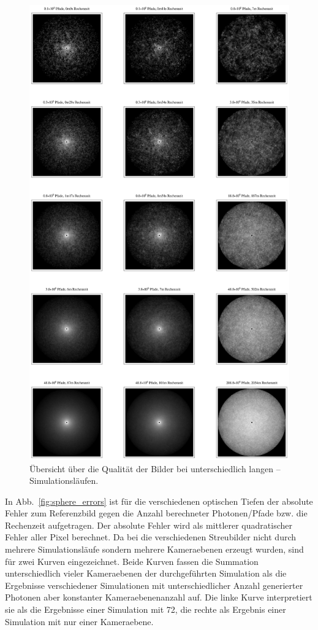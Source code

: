 		\begin{figure}
			\centering
			\includegraphics[height=1.0\textheight]{piratesphereimageoverview.eps}
			\caption{Übersicht über die Qualität der Bilder bei unterschiedlich langen \pirate--Simulationsläufen.}
			\label{fig:pirate_sphere_imageoverview}
		\end{figure}
	
	
	In Abb.~\ref{fig:sphere_errors} ist für die verschiedenen optischen Tiefen der absolute Fehler zum Referenzbild gegen die Anzahl berechneter Photonen/Pfade bzw. die Rechenzeit aufgetragen. Der absolute Fehler wird als mittlerer quadratischer Fehler aller Pixel berechnet. Da bei \mctd die verschiedenen Streubilder nicht durch mehrere Simulationsläufe sondern mehrere Kameraebenen erzeugt wurden, sind für \mctd zwei Kurven eingezeichnet. Beide Kurven fassen die Summation unterschiedlich vieler Kameraebenen der durchgeführten Simulation als die Ergebnisse verschiedener Simulationen mit unterschiedlicher Anzahl generierter Photonen aber konstanter Kameraebenenanzahl auf. Die linke Kurve interpretiert sie als die Ergebnisse einer Simulation mit 72, die rechte als Ergebnis einer Simulation mit nur einer Kameraebene.
	
